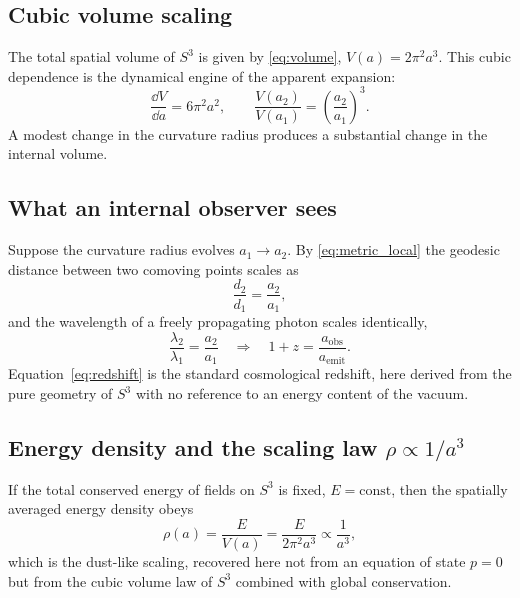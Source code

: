 \documentclass[12pt,a4paper]{article}
\theoremstyle{plain}
\theoremstyle{definition}
\begin{document}
\subsection{Cubic volume scaling}

The total spatial volume of $S^3$ is given by \eqref{eq:volume},
$V(a) = 2\pi^2 a^3$.
This cubic dependence is the dynamical engine of the apparent expansion:
\begin{equation}
  \frac{\dd V}{\dd a} = 6\pi^2 a^2,
  \qquad
  \frac{V(a_2)}{V(a_1)} = \left(\frac{a_2}{a_1}\right)^{\!3}.
  \label{eq:volume_scaling}
\end{equation}
A modest change in the curvature radius produces a substantial change in
the internal volume.

\subsection{What an internal observer sees}

Suppose the curvature radius evolves $a_1\to a_2$.
By \eqref{eq:metric_local} the geodesic distance between two comoving
points scales as
\begin{equation}
  \frac{d_2}{d_1} = \frac{a_2}{a_1},
  \label{eq:distance_scaling}
\end{equation}
and the wavelength of a freely propagating photon scales identically,
\begin{equation}
  \frac{\lambda_2}{\lambda_1} = \frac{a_2}{a_1}
  \quad\Longrightarrow\quad
  1 + z = \frac{a_{\mathrm{obs}}}{a_{\mathrm{emit}}}.
  \label{eq:redshift}
\end{equation}
Equation~\eqref{eq:redshift} is the standard cosmological redshift,
here derived from the pure geometry of $S^3$ with no reference to an
energy content of the vacuum.

\subsection{Energy density and the scaling law $\rho\propto 1/a^3$}

If the total conserved energy of fields on $S^3$ is fixed, $E=\mathrm{const}$,
then the spatially averaged energy density obeys
\begin{equation}
  \rho(a) = \frac{E}{V(a)} = \frac{E}{2\pi^2 a^3} \propto \frac{1}{a^3},
  \label{eq:rho_scaling}
\end{equation}
which is the dust-like scaling, recovered here not from an equation of
state $p=0$ but from the cubic volume law of $S^3$ combined with global
conservation.
\end{document}
